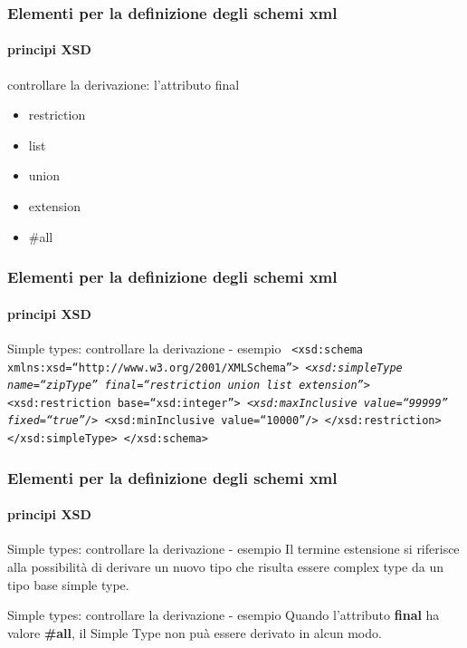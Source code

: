 \begin{frame}
	\frametitle{Elementi per la definizione degli schemi xml}
	\framesubtitle{principi XSD}
	\addtocounter{nframe}{1}

	\begin{block}{controllare la derivazione: l'attributo final}
		\begin{itemize}
			\item restriction
			\item list
			\item union
			\item extension
			\item \#all
		\end{itemize}
	\end{block}

\end{frame}


\begin{frame}
	\frametitle{Elementi per la definizione degli schemi xml}
	\framesubtitle{principi XSD}
	\addtocounter{nframe}{1}

	\begin{block}{Simple types: controllare la derivazione - esempio}
		\texttt{
			<xsd:schema xmlns:xsd=``http://www.w3.org/2001/XMLSchema''>
			\emph{<xsd:simpleType name=``zipType'' final=``restriction union list extension''>}
			<xsd:restriction base=``xsd:integer''>
			\emph{<xsd:maxInclusive value=``99999'' fixed=``true''/>}
			<xsd:minInclusive value=``10000''/>
			</xsd:restriction>
			</xsd:simpleType>
			</xsd:schema>
		}
	\end{block}

\end{frame}

\begin{frame}
	\frametitle{Elementi per la definizione degli schemi xml}
	\framesubtitle{principi XSD}
	\addtocounter{nframe}{1}

	\begin{block}{Simple types: controllare la derivazione - esempio}
		Il termine estensione si riferisce alla possibilità di derivare un nuovo tipo che risulta essere complex type da un tipo base simple type.
	\end{block}

	\begin{block}{Simple types: controllare la derivazione - esempio}
		Quando l'attributo  \textbf{final} ha valore \textbf{\#all}, il Simple Type non puà essere derivato in alcun modo.
	\end{block}

\end{frame}


